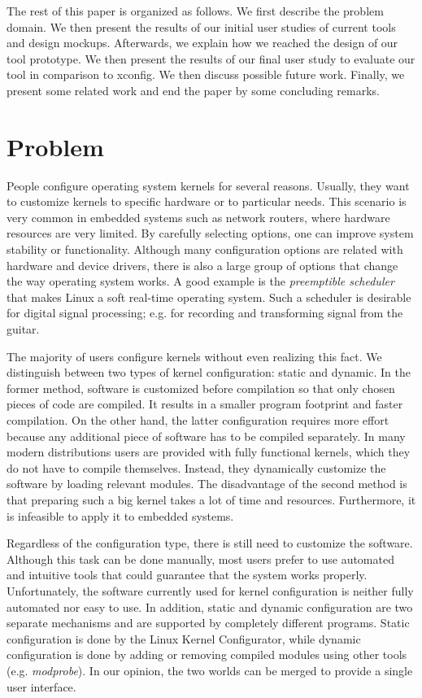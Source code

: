 \documentclass{chi2009}
\begin{document}
The rest of this paper is organized as follows. We first describe the problem domain. We then present the results of our initial user studies of current tools
and design mockups. Afterwards, we explain how we reached the design of our tool prototype. We then present the results of our final user study to evaluate our
tool in comparison to \textsf{xconfig}. We then discuss possible future work. Finally, we present some related work and end the paper by some concluding
remarks.

\section{Problem}\label{sec:problem}

People configure operating system kernels for several reasons. Usually, they want to customize kernels to specific hardware or to particular needs. This
scenario is very common in embedded systems such as network routers, where hardware resources are very limited. By carefully selecting options, one can improve
system stability or functionality. Although many configuration options are related with hardware and device drivers, there is also a large group of options that
change the way operating system works. A good example is the \textit{preemptible scheduler} that makes Linux a soft real-time
operating system. Such a scheduler is desirable for digital signal processing; e.g. for recording and transforming signal from the guitar.

The majority of users configure kernels without even realizing this fact. We distinguish between two types of kernel configuration: static and dynamic. In the
former method, software is customized before compilation so that only chosen pieces of code are compiled. It results in a smaller program footprint and faster
compilation. On the other hand, the latter configuration requires more effort because any additional piece of software has to be compiled separately. In many
modern distributions users are provided with fully functional kernels, which they do not have to compile themselves. Instead, they dynamically customize the
software by loading relevant modules. The disadvantage of the second method is that preparing such a big kernel takes a lot of time and resources. Furthermore,
it is infeasible to apply it to embedded systems.

Regardless of the configuration type, there is still need to customize the software. Although this task can be done manually, most users prefer to use automated
and intuitive tools that could guarantee that the system works properly. Unfortunately, the software currently used for kernel configuration is neither fully
automated nor easy to use. In addition, static and dynamic configuration are two separate mechanisms and are supported by completely different programs. Static
configuration is done by the Linux Kernel Configurator, while dynamic configuration is done by adding or removing compiled modules using other tools (e.g.
\textit{modprobe}). In our opinion, the two worlds can be merged to provide a single user interface.
\end{document}
